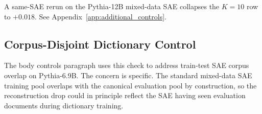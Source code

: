 \begin{table}[!htbp]
\centering
\caption{Top-$K$ residual principal-component ablation on the four models that pass the reconstruction-quality criterion, at $K=10$ with $K=5$ as a sparser-support control.
The drop is the paired difference between the unablated and ablated probe AUROC, with bootstrap 95\% CI from 10000 resamples.
The pre-registered decisive criterion, where the primary intervention beats both random-rotation and matched-Gaussian noise controls at the 95\% bootstrap margin, is met on zero of the six cells.
Pythia-12B is the only model where $K=10$ produces a substantial subspace-level drop. The remaining cells sit at the floor.}
\label{tab:kpc_kten_cells}
\end{table}

A same-SAE rerun on the Pythia-12B mixed-data SAE collapses the $K=10$ row to $+0.018$. See Appendix~\ref{app:additional_controls}.

\subsection{Corpus-Disjoint Dictionary Control}
\label{app:corpus_disjoint}

The body controls paragraph uses this check to address train-test SAE corpus overlap on Pythia-6.9B. The concern is specific. The standard mixed-data SAE training pool overlaps with the canonical evaluation pool by construction, so the reconstruction drop could in principle reflect the SAE having seen evaluation documents during dictionary training.

